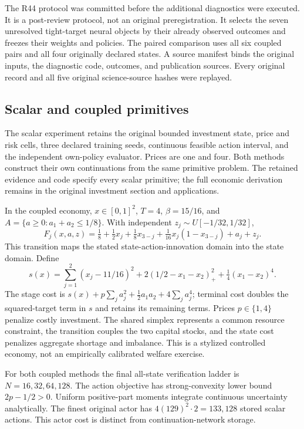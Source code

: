 \documentclass[ecta,nameyear,draft]{econsocart}
\begin{document}
The R44 protocol was committed before the additional diagnostics were executed. It is a post-review protocol, not an original preregistration. It selects the seven unresolved tight-target neural objects by their already observed outcomes and freezes their weights and policies. The paired comparison uses all six coupled pairs and all four originally declared states. A source manifest binds the original inputs, the diagnostic code, outcomes, and publication sources. Every original record and all five original science-source hashes were replayed.

\subsection{Scalar and coupled primitives}
The scalar experiment retains the original bounded investment state, price and risk cells, three declared training seeds, continuous feasible action interval, and the independent own-policy evaluator. Prices are one and four. Both methods construct their own continuations from the same primitive problem. The retained evidence and code specify every scalar primitive; the full economic derivation remains in the original investment section and applications.

In the coupled economy, $x\in[0,1]^2$, $T=4$, $\beta=15/16$, and
$A=\{a\geq0:a_1+a_2\leq1/8\}$. With independent $z_j\sim U[-1/32,1/32]$,
\[
 F_j(x,a,z)=\tfrac18+\tfrac12x_j+\tfrac18x_{3-j}
           +\tfrac1{16}x_j(1-x_{3-j})+a_j+z_j.
\]
This transition maps the stated state-action-innovation domain into the state domain. Define
\[
 s(x)=\sum_{j=1}^2(x_j-11/16)^2
       +2(1/2-x_1-x_2)_+^2+\tfrac14(x_1-x_2)^4.
\]
The stage cost is $s(x)+p\sum_ja_j^2+\tfrac12a_1a_2+4\sum_ja_j^4$; terminal cost doubles the squared-target term in $s$ and retains its remaining terms. Prices $p\in\{1,4\}$ penalize costly investment. The shared simplex represents a common resource constraint, the transition couples the two capital stocks, and the state cost penalizes aggregate shortage and imbalance. This is a stylized controlled economy, not an empirically calibrated welfare exercise.

For both coupled methods the final all-state verification ladder is $N=16,32,64,128$. The action objective has strong-convexity lower bound $2p-1/2>0$. Uniform positive-part moments integrate continuous uncertainty analytically. The finest original actor has $4(129)^2\cdot2=133{,}128$ stored scalar actions. This actor cost is distinct from continuation-network storage.
\end{document}

